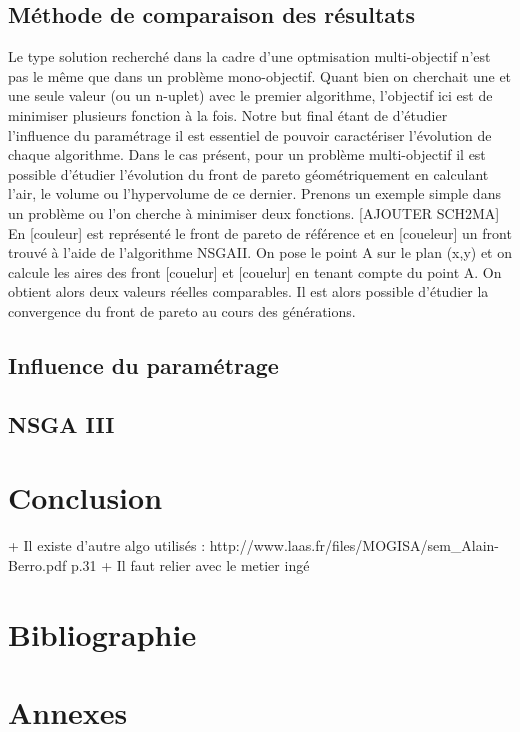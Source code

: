 \documentclass[12pt]{report}
\begin{document}
    \section{Méthode de comparaison des résultats}
      Le type solution recherché dans la cadre d'une optmisation multi-objectif n'est pas le même que dans un problème mono-objectif. Quant bien on cherchait une et une seule valeur (ou un n-uplet) avec le premier algorithme, l'objectif ici est de minimiser plusieurs fonction à la fois. Notre but final étant de d'étudier l'influence du paramétrage il est essentiel de pouvoir caractériser l'évolution de chaque algorithme. Dans le cas présent, pour un problème multi-objectif il est possible d'étudier l'évolution du front de pareto géométriquement en calculant l'air, le volume ou l'hypervolume de ce dernier. 
      Prenons un exemple simple dans un problème ou l'on cherche à minimiser deux fonctions. [AJOUTER SCH2MA] En [couleur] est représenté le front de pareto de référence et en [coueleur] un front trouvé à l'aide de l'algorithme NSGAII. On pose le point A sur le plan (x,y) et on calcule les aires des front [couelur] et [couelur] en tenant compte du point A. On obtient alors deux valeurs réelles comparables. Il est alors possible d'étudier la convergence du front de pareto au cours des générations.
    \section{Influence du paramétrage}
    \section{NSGA III}


  \chapter{Conclusion}
   + Il existe d'autre algo utilisés : http://www.laas.fr/files/MOGISA/sem_Alain-Berro.pdf p.31
   + Il faut relier avec le metier ingé
  \appendix

  \chapter{Bibliographie}
  \nocite{*} %
  
  

  \chapter{Annexes}
\end{document}
